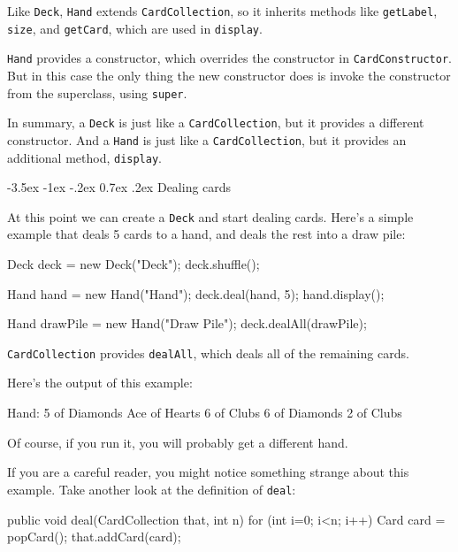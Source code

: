 \documentclass[12pt]{book}
\makeatletter
\theoremstyle{exercise}
\newcommand{\java}[1]{\verb"#1"}
\renewcommand{\section}{\@startsection{section}{1}{\z@}%
    {-3.5ex \@plus -1ex \@minus -.2ex}%
    {0.7ex \@plus.2ex}%
    {\normalfont\Large\bfseries}}
\newcommand{\java}[1]{\lstinline{#1}} %
\makeatother
\begin{document}
Like \java{Deck}, \java{Hand} extends \java{CardCollection}, so it inherits methods like \java{getLabel}, \java{size}, and \java{getCard}, which are used in \java{display}.

\java{Hand} provides a constructor, which overrides the constructor in \java{CardConstructor}.
But in this case the only thing the new constructor does is invoke the constructor from the superclass, using \java{super}.

In summary, a \java{Deck} is just like a \java{CardCollection}, but it provides a different constructor.
And a \java{Hand} is just like a \java{CardCollection}, but it provides an additional method, \java{display}.


\section{Dealing cards}

At this point we can create a \java{Deck} and start dealing cards.
Here's a simple example that deals 5 cards to a hand, and deals the rest into a draw pile:

\begin{code}
        Deck deck = new Deck("Deck");
        deck.shuffle();

        Hand hand = new Hand("Hand");
        deck.deal(hand, 5);
        hand.display();

        Hand drawPile = new Hand("Draw Pile");
        deck.dealAll(drawPile);
\end{code}

\java{CardCollection} provides \java{dealAll}, which deals all of the remaining cards.

Here's the output of this example:

\begin{stdout}
Hand: 
5 of Diamonds
Ace of Hearts
6 of Clubs
6 of Diamonds
2 of Clubs
\end{stdout}

Of course, if you run it, you will probably get a different hand.

If you are a careful reader, you might notice something strange about this example.
Take another look at the definition of \java{deal}:

\begin{code}
    public void deal(CardCollection that, int n) {
        for (int i=0; i<n; i++) {
            Card card = popCard();
            that.addCard(card);
        }
    }
\end{code}
\end{document}
